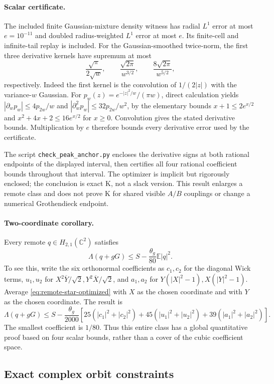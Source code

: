 \paragraph{Scalar certificate.}
The included finite Gaussian-mixture density witness has radial $L^1$ error
at most $e=10^{-11}$ and doubled radius-weighted $L^1$ error at most $e$.
Its finite-cell and infinite-tail replay is included. For the Gaussian-smoothed
twice-norm, the first three derivative kernels have supremum at most
\[
 \frac{\sqrt\pi}{2\sqrt w},\qquad
 \frac{\sqrt{2\pi}}{w^{3/2}},\qquad
 \frac{8\sqrt{2\pi}}{w^{5/2}},
\]
respectively. Indeed the first kernel is the convolution of $1/(2|z|)$ with
the variance-$w$ Gaussian. For $p_w(z)=e^{-|z|^2/w}/(\pi w)$, direct
calculation yields $|\partial_wp_w|\le4p_{2w}/w$ and
$|\partial_w^2p_w|\le32p_{2w}/w^2$, by the elementary bounds
$x+1\le2e^{x/2}$ and $x^2+4x+2\le16e^{x/2}$ for $x\ge0$.
Convolution gives the stated derivative bounds. Multiplication by $e$
therefore bounds every derivative error used by the certificate.

The script \texttt{check\_peak\_anchor.py} encloses the derivative signs at
both rational endpoints of the displayed interval, then certifies all four
rational coefficient bounds throughout that interval. The optimizer is
implicit but rigorously enclosed; the conclusion is exact K, not a slack
version. This result enlarges a remote class and does not prove K for shared
visible $A/B$ couplings or change a numerical Grothendieck endpoint.

\paragraph{Two-coordinate corollary.}
Every remote $q\in H_{2,1}(\mathbb C^2)$ satisfies
\[
 \boxed{\Lambda(q+gG)\le S-\frac{\theta_g}{80}\mathbb E|q|^2.}
\]
To see this, write the six orthonormal coefficients as $c_1,c_2$ for the
diagonal Wick terms, $u_1,u_2$ for
$X^2\overline Y/\sqrt2,Y^2\overline X/\sqrt2$, and $a_1,a_2$ for
$Y(|X|^2-1),X(|Y|^2-1)$. Average \eqref{eq:remote-star-optimized} with $X$
as the chosen coordinate and with $Y$ as the chosen coordinate. The result is
\[
 \Lambda(q+gG)\le S-\frac{\theta_g}{2000}
 \left[25(|c_1|^2+|c_2|^2)+45(|u_1|^2+|u_2|^2)
                         +39(|a_1|^2+|a_2|^2)\right].
\]
The smallest coefficient is $1/80$. Thus this entire class has a global
quantitative proof based on four scalar bounds, rather than a cover of the
cubic coefficient space.

\subsection{Exact complex orbit
constraints}\label{exact-complex-orbit-constraints}

